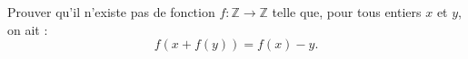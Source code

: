 Prouver qu'il n'existe pas de fonction $f : \mathbb{Z} \to \mathbb{Z}$ telle que, pour tous entiers $x$ et $y$, on ait :
\[
f(x + f(y)) = f(x) - y.
\]
